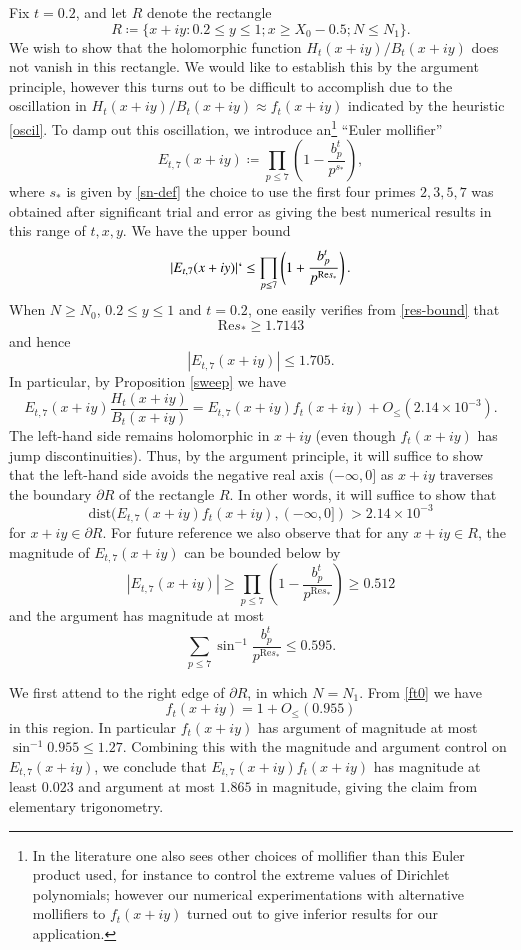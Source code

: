 Fix $t=0.2$, and let $R$ denote the rectangle
$$ R \coloneqq \{ x+iy: 0.2 \leq y \leq 1; x \geq X_0 - 0.5; N \leq N_1 \}.$$
We wish to show that the holomorphic function $H_t(x+iy)/B_t(x+iy)$ does not vanish in this rectangle.  We would like to establish this by the argument principle, however this turns out to be difficult to accomplish due to the oscillation in $H_t(x+iy)/B_t(x+iy) \approx f_t(x+iy)$ indicated by the heuristic \eqref{oscil}.  To damp out this oscillation, we introduce an\footnote{In the literature one also sees other choices of mollifier than this Euler product used, for instance to control the extreme values of Dirichlet polynomials; however our numerical experimentations with alternative mollifiers to $f_t(x+iy)$ turned out to give inferior results for our application.} ``Euler mollifier''
$$ E_{t,7}(x+iy) \coloneqq \prod_{p \leq 7} \left( 1 - \frac{b_p^t}{p^{s_*}}\right),$$
where $s_*$ is given by \eqref{sn-def} the choice to use the first four primes $2,3,5,7$ was obtained after significant trial and error as giving the best numerical results in this range of $t,x,y$.  We have the upper bound
$$
|E_{t,7}(x+iy)| `\leq \prod_{p \leq 7} \left(1 + \frac{b_p^t}{p^{\mathrm{Re} s_*}} \right).
$$
When $N \geq N_0$, $0.2 \leq y \leq 1$ and $t = 0.2$, one easily verifies from \eqref{res-bound} that
$$ \mathrm{Re} s_* \geq 1.7143$$
and hence
$$ |E_{t,7}(x+iy)| \leq 1.705.$$
In particular, by Proposition \ref{sweep} we have
$$ E_{t,7}(x+iy) \frac{H_t(x+iy)}{B_t(x+iy)} = E_{t,7}(x+iy) f_t(x+iy) + O_{\leq}( 2.14 \times 10^{-3} ).$$
The left-hand side remains holomorphic in $x+iy$ (even though $f_t(x+iy)$ has jump discontinuities).  Thus, by the argument principle, it will suffice to show that the left-hand side avoids the negative real axis $(-\infty,0]$ as $x+iy$ traverses the boundary $\partial R$ of the rectangle $R$.  In other words, it will suffice to show that
$$ \mathrm{dist}( E_{t,7}(x+iy) f_t(x+iy), (-\infty,0]) > 2.14 \times 10^{-3}$$
for $x+iy \in\partial R$.
For future reference we also observe that for any $x+iy \in R$,
the magnitude of $E_{t,7}(x+iy)$ can be bounded below by
$$ |E_{t,7}(x+iy)| \geq \prod_{p \leq 7} \left(1 - \frac{b_p^t}{p^{\mathrm{Re} s_*}} \right) \geq 0.512$$
and the argument has magnitude at most
$$ \sum_{p \leq 7} \sin^{-1} \frac{b_p^t}{p^{\mathrm{Re} s_*}} \leq 0.595.$$

We first attend to the right edge of $\partial R$, in which $N = N_1$.  
From \eqref{ft0} we have
$$
f_t(x+iy) = 1 + O_{\leq}( 0.955 )$$
in this region.  In particular $f_t(x+iy)$ has argument of magnitude at most $\sin^{-1} 0.955 \leq 1.27$.  Combining this with the magnitude and argument control on $E_{t,7}(x+iy)$, we conclude that $E_{t,7}(x+iy) f_t(x+iy)$ has magnitude at least $0.023$ and argument at most $1.865$ in magnitude, giving the claim from elementary trigonometry.

